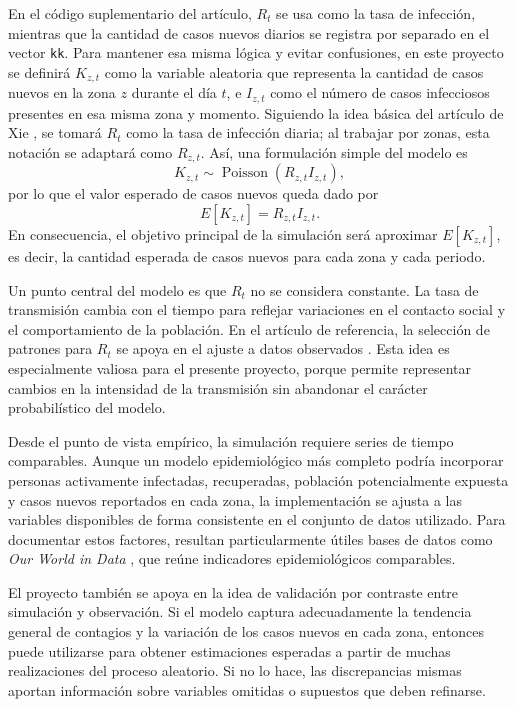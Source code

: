 \documentclass[12pt]{article}
\begin{document}
En el código suplementario del artículo, \(R_t\) se usa como la tasa de
infección, mientras que la cantidad de casos nuevos diarios se registra por
separado en el vector \texttt{kk}. Para mantener esa misma lógica y evitar
confusiones, en este proyecto se definirá \(K_{z,t}\) como la variable
aleatoria que representa la cantidad de casos nuevos en la zona \(z\) durante
el día \(t\), e \(I_{z,t}\) como el número de casos infecciosos presentes en
esa misma zona y momento. Siguiendo la idea básica del artículo de
Xie \cite{Xie2020}, se tomará \(R_t\) como la tasa de infección diaria; al
trabajar por zonas, esta notación se adaptará como \(R_{z,t}\). Así, una
formulación simple del modelo es
\[
  K_{z,t} \sim \operatorname{Poisson}(R_{z,t} I_{z,t}),
\]
por lo que el valor esperado de casos nuevos queda dado por
\[
  E[K_{z,t}] = R_{z,t} I_{z,t}.
\]
En consecuencia, el objetivo principal de la simulación será aproximar
\(E[K_{z,t}]\), es decir, la cantidad esperada de casos nuevos para cada zona y
cada periodo.

Un punto central del modelo es que \(R_t\) no se considera constante. La tasa
de transmisión cambia con el tiempo para reflejar variaciones en el contacto
social y el comportamiento de la población. En el artículo de referencia, la
selección de patrones para \(R_t\) se apoya en el ajuste a datos observados
\cite{Xie2020}. Esta idea es especialmente valiosa para el presente proyecto,
porque permite representar cambios en la intensidad de la transmisión sin
abandonar el carácter probabilístico del modelo.

Desde el punto de vista empírico, la simulación requiere series de tiempo
comparables. Aunque un modelo epidemiológico más completo podría incorporar
personas activamente infectadas, recuperadas, población potencialmente expuesta
y casos nuevos reportados en cada zona, la implementación se ajusta a las
variables disponibles de forma consistente en el conjunto de datos utilizado.
Para documentar estos factores, resultan particularmente útiles bases de datos
como \textit{Our World in Data} \cite{owid-coronavirus}, que reúne indicadores
epidemiológicos comparables.

El proyecto también se apoya en la idea de validación por contraste entre
simulación y observación.
Si el modelo captura adecuadamente la tendencia general de contagios y la
variación de los casos nuevos en cada zona, entonces puede utilizarse para
obtener estimaciones esperadas a partir de muchas realizaciones del proceso
aleatorio. Si no lo hace, las discrepancias mismas aportan información sobre
variables omitidas o supuestos que deben refinarse.
\end{document}
